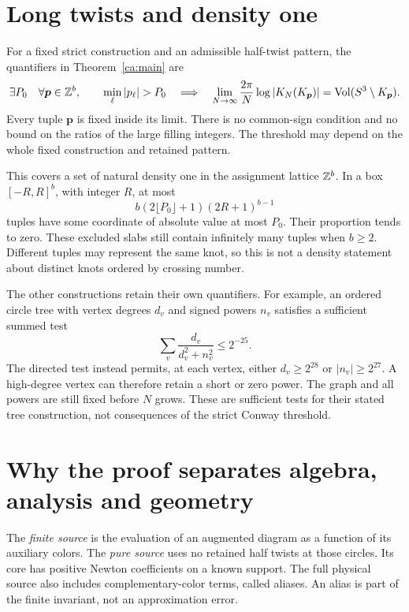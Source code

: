 \section{Long twists and density one}

For a fixed strict construction and an admissible half-twist
pattern, the quantifiers in Theorem~\ref{ca:main} are
\[
 \exists P_0\quad
 \forall\boldsymbol p\in\ZZ^b,\qquad
 \min_\ell|p_\ell|>P_0
 \quad\Longrightarrow\quad
 \lim_{N\to\infty}\frac{2\pi}{N}\log|K_N(K_{\boldsymbol p})|
       =\Vol(S^3\setminus K_{\boldsymbol p}).
\]
Every tuple $\boldsymbol p$ is fixed inside its limit.
There is no common-sign condition and no bound on the ratios
of the large filling integers. The threshold may depend on the
whole fixed construction and retained pattern.

This covers a set of natural density one in the assignment lattice
$\mathbb Z^b$. In a box $[-R,R]^b$, with integer $R$, at most
\[
 b(2\lfloor P_0\rfloor+1)(2R+1)^{b-1}
\]
tuples have some coordinate of absolute value at most $P_0$.
Their proportion tends to zero. These excluded slabs still contain
infinitely many tuples when $b\ge2$. Different tuples may represent
the same knot, so this is not a density statement about distinct
knots ordered by crossing number.

The other constructions retain their own quantifiers. For example,
an ordered circle tree with vertex degrees $d_v$ and signed powers
$n_v$ satisfies a sufficient summed test
\[
                  \sum_v\frac{d_v}{d_v^2+n_v^2}\le2^{-25}.
\]
The directed test instead permits, at each vertex, either
$d_v\ge2^{28}$ or $|n_v|\ge2^{27}$.
A high-degree vertex can therefore retain a short or zero power.
The graph and all powers are still fixed before $N$ grows.
These are sufficient tests for their stated tree construction,
not consequences of the strict Conway threshold.

\section{Why the proof separates algebra, analysis and geometry}
\label{sec:proof-language}

The \emph{finite source} is the evaluation of an augmented diagram
as a function of its auxiliary colors. The \emph{pure source}
uses no retained half twists at those circles. Its core has positive
Newton coefficients on a known support. The full physical source
also includes complementary-color terms, called aliases.
An alias is part of the finite invariant, not an approximation
error.

